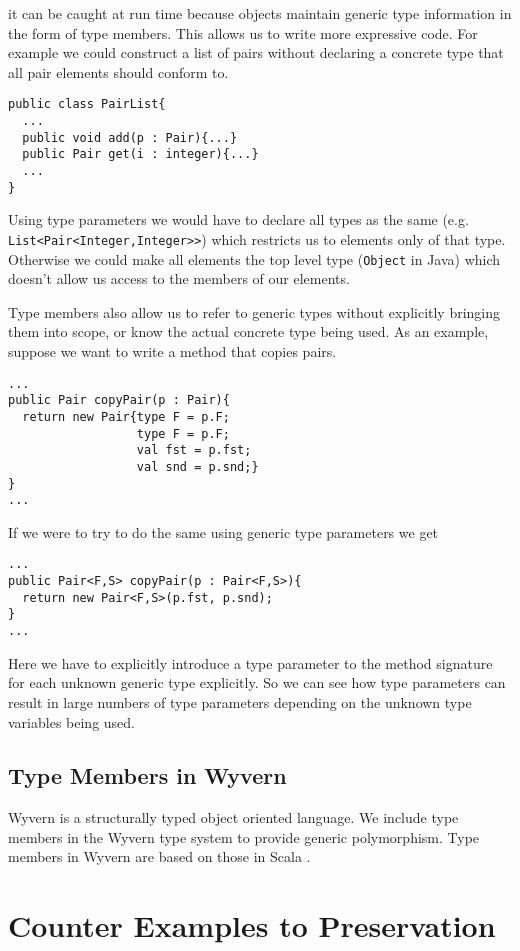 \documentclass{llncs}
\numberwithin{subcase}{casethm}
\numberwithin{casethm}{theorem}
\numberwithin{casethm}{lemma}
\begin{document}
it can be caught at run time because objects maintain 
generic type information in the form of type members.
This allows us to write more expressive code. For example 
we could construct a list of pairs without declaring 
a concrete type that all pair elements should conform to.
\begin{lstlisting}[mathescape, style=custom_lang]
public class PairList{
  ...
  public void add(p : Pair){...}
  public Pair get(i : integer){...}
  ...
}
\end{lstlisting}
Using type parameters we would have to declare all 
types as the same (e.g. \texttt{List<Pair<Integer,Integer>>}) 
which restricts us to elements only of that type. Otherwise 
we could make all elements the top level type (\texttt{Object} 
in Java) which doesn't allow us access to the members 
of our elements.

Type members also allow us to refer to generic types without explicitly 
bringing them into scope, or know the actual concrete type 
being used. As an example, suppose we want to write a method that copies  
pairs.
\begin{lstlisting}[mathescape, style=custom_lang]
...
public Pair copyPair(p : Pair){
  return new Pair{type F = p.F; 
                  type F = p.F;
                  val fst = p.fst; 
                  val snd = p.snd;}
}
...
\end{lstlisting}
If we were to try to do the same using generic type parameters
we get
\begin{lstlisting}[mathescape, style=custom_lang]
...
public Pair<F,S> copyPair(p : Pair<F,S>){
  return new Pair<F,S>(p.fst, p.snd);
}
...
\end{lstlisting}
Here we have to explicitly introduce a type parameter to the 
method signature for each unknown generic type explicitly.
So we can see how type parameters can result in large 
numbers of type parameters  \cite{odersky:2009} %
depending on the unknown type variables being used.

\subsection{Type Members in Wyvern}
Wyvern is a structurally typed object oriented language. We 
include type members in the Wyvern type system to provide 
generic polymorphism. Type members in Wyvern are based on 
those in Scala \cite{Amin:2012}\cite{Amin:2014}.

\section{Counter Examples to Preservation}
	\label{s:examples}
\end{document}
